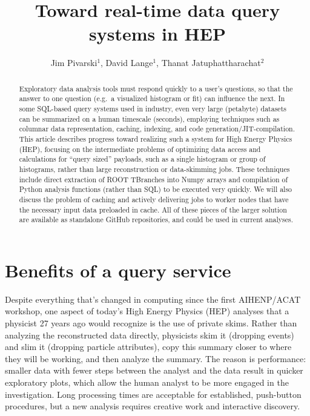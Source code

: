 \documentclass[a4paper]{jpconf}
\begin{document}
\title{Toward real-time data query systems in HEP}

\author{Jim Pivarski$^1$, David Lange$^1$, Thanat Jatuphattharachat$^2$}

\address{$^1$ Physics Department, Princeton University, Princeton, NJ 08544, USA}
\address{$^2$ Computer Engineering Chulalongkorn University, Krung Thep Maha Nakhon 10330, Thailand}


\begin{abstract}
Exploratory data analysis tools must respond quickly to a user's questions, so that the answer to one question (e.g.\ a visualized histogram or fit) can influence the next. In some SQL-based query systems used in industry, even very large (petabyte) datasets can be summarized on a human timescale (seconds), employing techniques such as columnar data representation, caching, indexing, and code generation/JIT-compilation. This article describes progress toward realizing such a system for High Energy Physics (HEP), focusing on the intermediate problems of optimizing data access and calculations for ``query sized'' payloads, such as a single histogram or group of histograms, rather than large reconstruction or data-skimming jobs. These techniques include direct extraction of ROOT TBranches into Numpy arrays and compilation of Python analysis functions (rather than SQL) to be executed very quickly. We will also discuss the problem of caching and actively delivering jobs to worker nodes that have the necessary input data preloaded in cache. All of these pieces of the larger solution are available as standalone GitHub repositories, and could be used in current analyses.
\end{abstract}

\section{Benefits of a query service}

Despite everything that's changed in computing since the first AIHENP/ACAT workshop, one aspect of today's High Energy Physics (HEP) analyses that a physicist 27 years ago would recognize is the use of private skims. Rather than analyzing the reconstructed data directly, physicists skim it (dropping events) and slim it (dropping particle attributes), copy this summary closer to where they will be working, and then analyze the summary. The reason is performance: smaller data with fewer steps between the analyst and the data result in quicker exploratory plots, which allow the human analyst to be more engaged in the investigation. Long processing times are acceptable for established, push-button procedures, but a new analysis requires creative work and interactive discovery.
\end{document}
